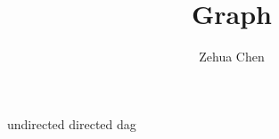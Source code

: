 \documentclass[11pt, letterpaper]{report}
\title{Graph}
\author{Zehua Chen}
\begin{document}
  \maketitle
  \tableofcontents

  {undirected}
  {directed}
  {dag}
\end{document}
